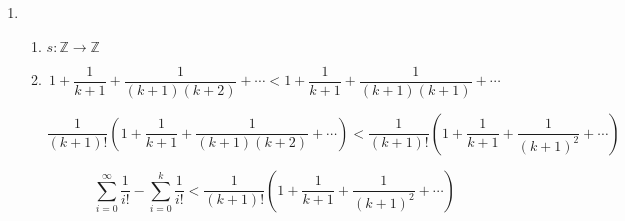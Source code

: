 \documentclass[12pt,letterpaper]{article}
\begin{document}
\begin{enumerate}
{$$ a_n = (1 + x)^n$$
$$ a_{n+1} = (1 + x)^{n+1} = (1 + x)^n (1 + x) = (1 + x) a_n = a_n + x a_n $$
$$ b_n = 1 + nx$$
$$ b_{n + 1} = 1 + (n + 1)x = 1 + nx + x = b_n + x $$
$$ a_{n+1} - a_n = x a_n $$
$$ b_{n+1} - b_n = x$$
$$ a_n > b_n$$
\begin{center}(by the inductive hypothesis)\end{center}
\begin{center}If $a_n > 1$ \end{center}
$$ x a_n > x$$
$$ a_n + x a_n > b_n + x $$
$$ a_{n+1} > b_{n+1}$$
\begin{center}Otherwise\end{center}
$$a_n < 1$$
$$ x > -1$$
\begin{center}(by the premise)\end{center}
$$ 1 + x  > 0$$
$$ -1 < x < 0 $$
\begin{center}(because we have $a_n < 1$)\end{center}
$$ (1 + x)^{n + 1} > 0) $$
\begin{center}(because a positive number to a power is a positive)\end{center}
$$a_n > 0$$
$$ 0 < a_n < 1 $$
$$ x a_n > x$$
\begin{center}(because a negative number times something less than one is greater than that original negative number)\end{center}
$$ a_n > b_n$$
\begin{center}(by the inductive hypothesis)\end{center}
$$ a_n + x a_n > b_n + x $$
$$ a_{n+1} > b_{n+1}$$

Therefore for any $a_n$, if $ a_n > b_n $, then $ a_n > b_n $ or in other words, if $(1+x)^n \geq 1 + nx$ then $(1+x)^{n + 1} \geq 1 + (n + 1)x$. By the axiom of induction, $(1+x)^n \geq 1 + nx$.
}

\item {
\begin{enumerate}
\item {$s: \mathbb{Z} \to \mathbb{Z}$}

\item {
$$ 1 + \frac 1 {k+1} + \frac 1 {(k+1)(k+2)} + \cdots <  1 + \frac 1 {k+1} +\frac 1{(k+1)(k+1)} + \cdots $$

$$\frac 1 {(k+1)!} \left( 1 + \frac 1 {k+1} + \frac 1 {(k+1)(k+2)} + \cdots\right) < \frac 1 {(k+1)!} \left( 1 + \frac 1 {k+1} + \frac 1{(k+1)^2} + \cdots\right)$$

$$\sum_{i=0}^\infty \frac 1 {i!} - \sum_{i=0}^k \frac 1 {i!} < \frac 1 {(k+1)!}\left( 1 + \frac 1 {k+1} + \frac 1{(k+1)^2} + \cdots \right)$$

}
\end{enumerate}}
\end{enumerate}
\end{document}
